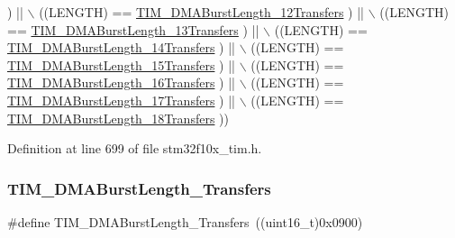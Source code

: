 \begin{DoxyCode}
      ) || \(\backslash\)
                                   ((LENGTH) == \hyperlink{group___t_i_m___d_m_a___burst___length_ga9160d52913bbd7ad1e663ff943d01852}{TIM\_DMABurstLength\_12Transfers}
      ) || \(\backslash\)
                                   ((LENGTH) == \hyperlink{group___t_i_m___d_m_a___burst___length_ga11485e9eee8a6a7edc1df868755eab85}{TIM\_DMABurstLength\_13Transfers}
      ) || \(\backslash\)
                                   ((LENGTH) == \hyperlink{group___t_i_m___d_m_a___burst___length_gab1a097ca7404e518839df99795443fb0}{TIM\_DMABurstLength\_14Transfers}
      ) || \(\backslash\)
                                   ((LENGTH) == \hyperlink{group___t_i_m___d_m_a___burst___length_gad13373f5fd246557a4fc487dc43c37ec}{TIM\_DMABurstLength\_15Transfers}
      ) || \(\backslash\)
                                   ((LENGTH) == \hyperlink{group___t_i_m___d_m_a___burst___length_gafb644e6033f7b46c602b02754b69fde0}{TIM\_DMABurstLength\_16Transfers}
      ) || \(\backslash\)
                                   ((LENGTH) == \hyperlink{group___t_i_m___d_m_a___burst___length_ga5b2c97f650a3c1726965187d852b8cc5}{TIM\_DMABurstLength\_17Transfers}
      ) || \(\backslash\)
                                   ((LENGTH) == \hyperlink{group___t_i_m___d_m_a___burst___length_gaed9f2afef174079f6eb6927abd995b9b}{TIM\_DMABurstLength\_18Transfers}
      ))
\end{DoxyCode}


Definition at line 699 of file stm32f10x\+\_\+tim.\+h.

\mbox{\label{group___t_i_m___d_m_a___burst___length_ga2fc09f2148cf6ebddc8e67116212259c}} 
\subsubsection{\texorpdfstring{T\+I\+M\+\_\+\+D\+M\+A\+Burst\+Length\+\_\+Transfers}{TIM\_DMABurstLength\_10Transfers}}
{\footnotesize\ttfamily \#define T\+I\+M\+\_\+\+D\+M\+A\+Burst\+Length\+\_\+Transfers~((uint16\+\_\+t)0x0900)}



